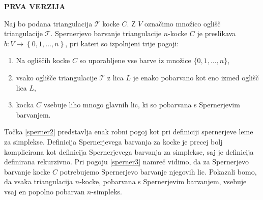 \documentclass[mat1]{fmfdelo}
\newcommand{\0}{0}
\newcommand{\pT}{\mathcal T}
\begin{document}
\textbf{PRVA VERZIJA}
\begin{definicija}\label{def:aloalo}
Naj bo podana triangulacija $\pT$ kocke $C$. Z $V$ označimo množico oglišč triangulacije $\pT$. Spernerjevo barvanje triangulacije $n$-kocke $C$ je preslikava $b : V \to \left \{ 0, 1, \dots, n \right \}$, pri kateri so izpolnjeni trije pogoji:
\begin{enumerate}
\item Na ogliščih kocke $C$ so uporabljene vse barve iz množice $\{0, 1, \dots, n \}$, \label{sperner1}
\item vsako oglišče triangulacije $\pT$ z lica $L$ je enako pobarvano kot eno izmed oglišč lica $L$,\label{sperner2}
\item kocka $C$ vsebuje liho mnogo glavnih lic, ki so pobarvana s Spernerjevim barvanjem.\label{sperner3}
\end{enumerate}
\end{definicija}
Točka \eqref{sperner2} predstavlja enak robni pogoj kot pri definiciji spernerjeve leme za simplekse.
Definicija Spernerjevega barvanja za kocke je precej bolj komplicirana kot definicija Spernerjevega barvanja za simplekse, saj je definicija \label{def:cubsperner} definirana rekurzivno. Pri pogoju \eqref{sperner3} namreč vidimo, da za Spernerjevo barvanje kocke $C$ potrebujemo Spernerjevo barvanje njegovih lic.
Pokazali bomo, da vsaka triangulacija $n$-kocke, pobarvana s Spernerjevim barvanjem, vsebuje vsaj en popolno pobarvan $n$-simpleks.
\end{document}
